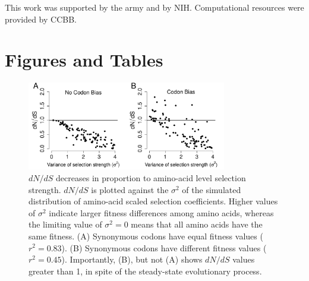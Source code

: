 \documentclass{pnastwo}
\begin{document}
\begin{article}
		
\begin{acknowledgments}
	This work was supported by the army and by NIH. Computational resources were provided by CCBB.
\end{acknowledgments}
		

		
		


		
		
\end{article}
	
	
\section*{Figures and Tables }

\vspace{2cm}
	
\begin{figure}[htbp]
	\centerline{\includegraphics[width=8.7cm]{figures/MainText/dnds_variance.pdf}}
	\caption{\label{dnds_variance} $dN/dS$ decreases in proportion to amino-acid level selection strength. $dN/dS$ is plotted against the $\sigma^2 $ of the simulated distribution of amino-acid scaled selection coefficients. Higher values of $\sigma^2$ indicate larger fitness differences among amino acids, whereas the limiting value of $\sigma^2 = 0$ means that all amino acids have the same fitness. (A) Synonymous codons have equal fitness values ($r^2=0.83$). (B) Synonymous codons have different fitness values ($r^2=0.45$). Importantly, (B), but not (A) shows $dN/dS$ values greater than 1, in spite of the steady-state evolutionary process.}
\end{figure}
		
		
\vspace{2cm}
		
\end{document}
